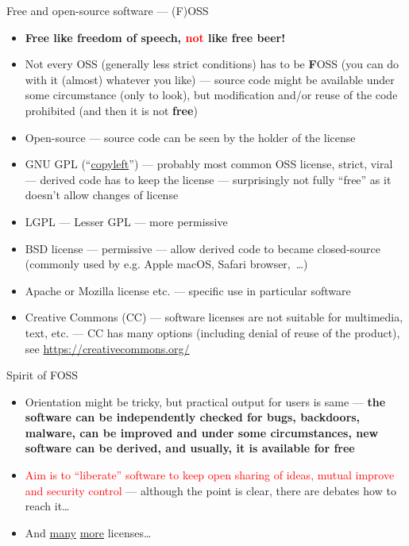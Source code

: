\documentclass[compress, ucs, xelatex, 11pt, xcolor=svgnames,
  hyperref={
    bookmarks=true,
    unicode=true,
    colorlinks=true,
    pdftitle={Linux, command line and MetaCentrum},
    plainpages=false,
    pdfauthor={Vojtech Zeisek},
    pdfsubject={Course about use of Linux command line, writing shell scripts and using MetaCentrum of CESNET},
    pdfcreator={XeLaTeX},
    pdfkeywords={Linux, GNU, BASH, shell, command line, MetaCentrum},
    linkcolor=DarkRed,
    anchorcolor=DarkBlue,
    citecolor=Indigo,
    filecolor=NavyBlue,
    menucolor=DarkMagenta,
    urlcolor=DarkBlue,
    pdftex},
  url={hyphens, lowtilde} %
  ]{beamer}
\renewcommand{\alert}[1]{\textcolor{red}{#1}}
\begin{document}
\begin{frame}[allowframebreaks]{Free and open-source software --- (F)OSS}
  \begin{itemize}
    \item \textbf{Free like freedom of speech, \alert{not} like free beer!}
    \item Not every OSS (generally less strict conditions) has to be \textbf{F}OSS (you can do with it (almost) whatever you like) --- source code might be available under some circumstance (only to look), but modification and/or reuse of the code prohibited (and then it is not \textbf{free})
    \item Open-source --- source code can be seen by the holder of the license
    \item GNU GPL (``\href{https://www.gnu.org/copyleft/}{copyleft}'') --- probably most common OSS license, strict, viral --- derived code has to keep the license --- surprisingly not fully ``free'' as it doesn't allow changes of license
    \item LGPL --- Lesser GPL --- more permissive
    \item BSD license --- permissive --- allow derived code to became closed-source (commonly used by e.g. Apple macOS, Safari browser,~\ldots)
    \item Apache or Mozilla license etc. --- specific use in particular software
    \item Creative Commons (CC) --- software licenses are not suitable for multimedia, text, etc. --- CC has many options (including denial of reuse of the product), see \url{https://creativecommons.org/}
  \end{itemize}
  \begin{block}{Spirit of FOSS}
    \begin{itemize}
      \item Orientation might be tricky, but practical output for users is same --- \textbf{the software can be independently checked for bugs, backdoors, malware, can be improved and under some circumstances, new software can be derived, and usually, it is available for free}
      \item \alert{Aim is to ``liberate'' software to keep open sharing of ideas, mutual improve and security control} --- although the point is clear, there are debates how to reach it\ldots
    \end{itemize}
  \end{block}
  \begin{itemize}
    \item And \href{https://en.wikipedia.org/wiki/Comparison_of_free_and_open-source_software_licenses}{many} \href{https://opensource.org/licenses}{more} licenses\ldots
  \end{itemize}
\end{frame}
\end{document}

